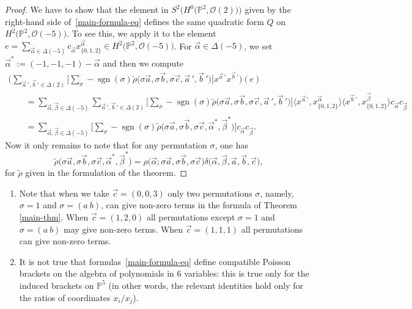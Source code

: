 \documentclass[10pt,a4paper]{amsart}
\numberwithin{equation}{section}
\renewcommand{\P}{{\mathbb P}}
\newcommand{\OO}{{\mathcal O}}
\begin{document}
\begin{proof}
 We have to show that the element in $S^2\big(H^0\big(\P^2,\OO(2)\big)\big)$ given by the right-hand side of~\eqref{main-formula-eq}
defines the same quadratic form $Q$ on $H^2\big(\P^2,\OO(-5)\big)$.
To see this, we apply it to the element $e=\sum_{\vec{\alpha}\in \Delta(-5)}c_{\vec{\alpha}}x^{\vec{\alpha}}_{\{0,1,2\}}\in H^2\big(\P^2,\OO(-5)\big)$. For $\vec{\alpha}\in \Delta(-5)$, we set $\vec{\alpha}^*:=(-1,-1,-1)-\vec{\alpha}$ and then we compute
\begin{gather*}
	\bigg(\sum_{\vec{a}\,{}',\vec{b}\,{}'\in \Delta(2)}\bigg[\sum_{\sigma}-\operatorname{sgn}(\sigma)\tilde{\rho}\big(\sigma\vec{a}, \sigma\vec{b},\sigma\vec{c},\vec{a}\,{}',\vec{b}\,{}'\big)\bigg]x^{\vec{a}\,{}'}x^{\vec{b}\,{}'}\bigg)(e)\\
\qquad{}=	\sum_{\vec{\alpha},\vec{\beta}\in \Delta(-5)}\sum_{\vec{a}\,{}',\vec{b}\,{}'\in \Delta(2)}\!\!\bigg[\sum_{\sigma}-\operatorname{sgn}(\sigma)\tilde{\rho}\big(\sigma\vec{a}, \sigma\vec{b},\sigma\vec{c},\vec{a}\,{}',\vec{b}\,{}'\big)\bigg]\langle x^{\vec{a}\,{}'},x^{\vec{\alpha}}_{\{0,1,2\}}\rangle \langle x^{\vec{b}\,{}'},x^{\vec{\beta}}_{\{0,1,2\}}\rangle c_{\vec{\alpha}}c_{\vec{\beta}}\\
\qquad{}=	\sum_{\vec{\alpha},\vec{\beta}\in \Delta(-5)}\bigg[\sum_{\sigma}-\operatorname{sgn}(\sigma)\tilde{\rho}\big(\sigma \vec{a},\sigma \vec{b},\sigma \vec{c},\vec{\alpha}^*,\vec{\beta}^*\big)\bigg]c_{\vec{\alpha}}c_{\vec{\beta}}.
\end{gather*}
Now it only remains to note that for any permutation $\sigma$, one has
\[
\tilde{\rho}\big(\sigma\vec{a}, \sigma\vec{b},\sigma\vec{c},\vec{\alpha}^*,\vec{\beta}^*\big)=\rho\big(\vec{\alpha};\sigma\vec{a}, \sigma\vec{b},\sigma\vec{c}\big)\delta\big(\vec{\alpha},\vec{\beta},\vec{a},\vec{b},\vec{c}\big),
\]
for $\tilde{\rho}$ given in the formulation of the theorem. \end{proof}


\begin{Remarks}\quad
\begin{enumerate}\itemsep=0pt
\item Note that when we take $\vec{c}=(0,0,3)$ only two permutations $\sigma$, namely, $\sigma=1$ and $\sigma=(a \ b)$, can give non-zero terms in the formula of
Theorem \ref{main-thm}. When $\vec{c}=(1,2,0)$ all permutations except $\sigma=1$ and $\sigma=(a \ b)$ may give non-zero terms. When $\vec{c}=(1,1,1)$ all permutations can give non-zero terms.

\item It is not true that formulas~\eqref{main-formula-eq} define compatible Poisson brackets on the algebra of polynomials in $6$ variables: this is true only for the induced
brackets on $\P^5$ (in other words, the relevant identities hold only for the ratios of coordinates $x_i/x_j$).
\end{enumerate}
\end{Remarks}
\end{document}
